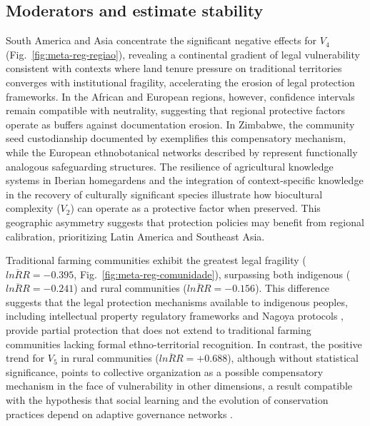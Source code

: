 \documentclass[12pt,a4paper]{article}
\begin{document}
\subsection{Moderators and estimate stability}
\label{sec:moderadores-discussao}

South America and Asia concentrate the significant negative effects for $V_4$ (Fig.~\ref{fig:meta-reg-regiao}), revealing a continental gradient of legal vulnerability consistent with contexts where land tenure pressure on traditional territories converges with institutional fragility, accelerating the erosion of legal protection frameworks. In the African and European regions, however, confidence intervals remain compatible with neutrality, suggesting that regional protective factors operate as buffers against documentation erosion. In Zimbabwe, the community seed custodianship documented by \citet{Sibanda2025} exemplifies this compensatory mechanism, while the European ethnobotanical networks described by \citet{Gerner2025} represent functionally analogous safeguarding structures. The resilience of agricultural knowledge systems in Iberian homegardens \citep{ReyesGarcia2014} and the integration of context-specific knowledge in the recovery of culturally significant species \citep{Rayne2022} illustrate how biocultural complexity ($V_2$) can operate as a protective factor when preserved. This geographic asymmetry suggests that protection policies may benefit from regional calibration, prioritizing Latin America and Southeast Asia.

Traditional farming communities exhibit the greatest legal fragility ($\overline{lnRR} = -0.395$, Fig.~\ref{fig:meta-reg-comunidade}), surpassing both indigenous ($\overline{lnRR} = -0.241$) and rural communities ($\overline{lnRR} = -0.156$). This difference suggests that the legal protection mechanisms available to indigenous peoples, including intellectual property regulatory frameworks and Nagoya protocols \citep{BavikatteRobinson2011,Robinson2014}, provide partial protection that does not extend to traditional farming communities lacking formal ethno-territorial recognition. In contrast, the positive trend for $V_5$ in rural communities ($\overline{lnRR} = +0.688$), although without statistical significance, points to collective organization as a possible compensatory mechanism in the face of vulnerability in other dimensions, a result compatible with the hypothesis that social learning and the evolution of conservation practices depend on adaptive governance networks \citep{BerkesTurner2006,Folke2004}.
\end{document}
